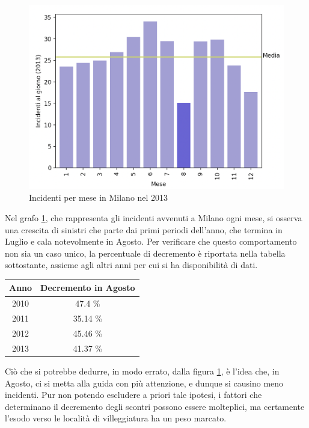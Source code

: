 \documentclass[a4paper,12pt]{report}
\begin{document}
\begin{figure}
    \hfill\includegraphics[width=0.7\linewidth]{../src/incidenti/incidenti_senza_coords/mese_incidenti/milano_mese.png}\hspace*{\fill}
    \caption{Incidenti per mese in Milano nel 2013}
    \label{fig:milano-mese}
\end{figure}

Nel grafo \ref{fig:milano-mese}, che rappresenta gli incidenti avvenuti a Milano ogni mese, 
si osserva una crescita di sinistri che parte dai primi periodi 
dell'anno, che termina in Luglio e cala notevolmente in Agosto. 
Per verificare che questo comportamento non sia 
un caso unico, la percentuale di decremento è riportata nella tabella sottostante, 
assieme agli altri anni per cui si ha disponibilità di dati. 

\begin{center}
    \def\arraystretch{1.5}%
    \begin{tabular}{ |c|c| } 
        \hline
        Anno & Decremento in Agosto \\ 
        \hline
        2010 & 47.4 \%  \\ 
        \rowcolor{TableGray}
        2011 & 35.14 \% \\
        2012 & 45.46 \% \\
        \rowcolor{TableGray}
        2013 & 41.37 \% \\
        \hline
    \end{tabular}
\end{center}

Ciò che si potrebbe dedurre, in modo errato, dalla figura \ref{fig:milano-mese}, 
è l'idea che, in Agosto, ci si metta alla guida con più attenzione, 
e dunque si causino meno incidenti. 
Pur non potendo escludere a priori tale ipotesi, i fattori che determinano 
il decremento degli scontri possono essere molteplici, 
ma certamente l'esodo verso le località di villeggiatura ha un peso marcato.
\end{document}
